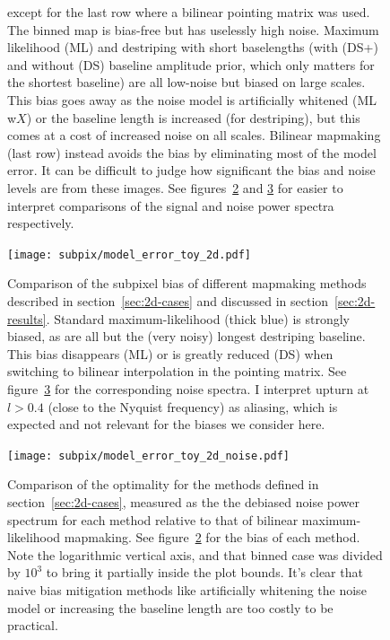 \documentclass[twocolumn,apj]{aastex63}
\begin{document}
\begin{figure}[p]
{		except for the last row where a bilinear pointing matrix was used.
		The binned map is bias-free but has uselessly high noise. Maximum likelihood (ML)
		and destriping with short baselengths (with (DS+) and without (DS) baseline amplitude prior,
		which only matters for the shortest baseline)
		are all low-noise but biased on large scales. This bias goes away as the noise model
		is artificially whitened (ML w$X$) or the baseline length is increased (for destriping),
		but this comes at a cost of increased noise on all scales.
		Bilinear mapmaking (last row) instead avoids the bias by eliminating most of the model error.
		It can be difficult to judge how significant the bias and noise levels are from
		these images. See figures~\ref{fig:2d-bias} and \ref{fig:2d-noise} for easier to
		interpret comparisons of the signal and noise power spectra respectively.
	}
	\label{fig:2d-maps}
\end{figure}

\begin{figure}
	\centering
	\hspace*{-5mm}\texttt{[image: subpix/model\_error\_toy\_2d.pdf]}
	\caption{
		Comparison of the subpixel bias of different mapmaking methods
		described in section~\ref{sec:2d-cases} and discussed in section~\ref{sec:2d-results}.
		Standard maximum-likelihood (thick blue) is strongly biased, as are all but
		the (very noisy) longest destriping baseline. This bias disappears (ML)
		or is greatly reduced (DS) when switching to bilinear interpolation in the pointing matrix.
		See figure~\ref{fig:2d-noise} for the corresponding noise spectra.
		I interpret upturn at $l>0.4$ (close to the Nyquist frequency) as aliasing, which
		is expected and not relevant for the biases we consider here.
	}
	\label{fig:2d-bias}
\end{figure}

\begin{figure}[h!]
	\centering
	\hspace*{-5mm}\texttt{[image: subpix/model\_error\_toy\_2d\_noise.pdf]}
	\caption{
		Comparison of the optimality for the methods defined in section~\ref{sec:2d-cases}, measured
		as the the debiased noise power spectrum for each method relative
		to that of bilinear maximum-likelihood mapmaking. See figure~\ref{fig:2d-bias}
		for the bias of each method.
		Note the logarithmic vertical axis, and that binned case was divided by $10^3$
		to bring it partially inside the plot bounds.
		It's clear that naive bias mitigation
		methods like artificially whitening the noise model or increasing the
		baseline length are too costly to be practical.
	}
	\label{fig:2d-noise}
\end{figure}
\end{document}
